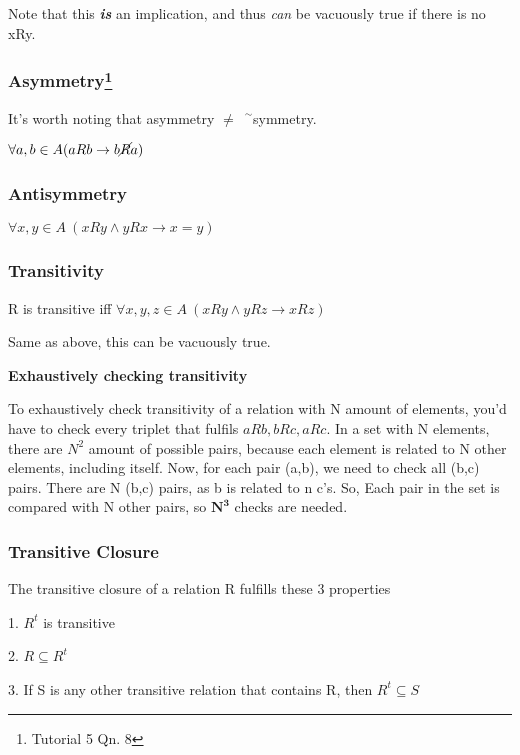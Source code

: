 \documentclass{article}
\newcommand{\negation}{${\phantom{0}}^\sim$}
\begin{document}
\vspace{10pt}

Note that this \textit{\textbf{is}} an implication, and thus \textit{can} be vacuously true if there is no xRy.


\subsubsection[Asymmetry]{Asymmetry\footnote{Tutorial 5 Qn. 8}}
It's worth noting that asymmetry $\neq$\negation symmetry.

$\forall a,b \in A (aRb \rightarrow b\cancel{R} a)$

\subsubsection{Antisymmetry}
\begin{center}
    $\forall x,y \in A\ (xRy \wedge yRx \rightarrow x=y)$
\end{center}

\subsubsection{Transitivity}
R is transitive iff $\forall x,y,z \in A\ (xRy \wedge yRz \rightarrow xRz)$

Same as above, this can be vacuously true.

\vspace{10pt}

\textbf{Exhaustively checking transitivity}

To exhaustively check transitivity of a relation with N amount of elements, you'd have to check every triplet that fulfils $aRb, bRc, aRc$. In a set with N elements, there are $N^2$ amount of possible pairs, because each element is related to N other elements, including itself. Now, for each pair (a,b), we need to check all (b,c) pairs. There are N (b,c) pairs, as b is related to n c's. So, Each pair in the set is compared with N other pairs, so $\mathbf{N^3}$ checks are needed.

\subsubsection{Transitive Closure}
The transitive closure of a relation R fulfills these 3 properties

1. $R^t$ is transitive

2. $R \subseteq R^t$

3. If S is any other transitive relation that contains R, then $R^t \subseteq S$
\end{document}
